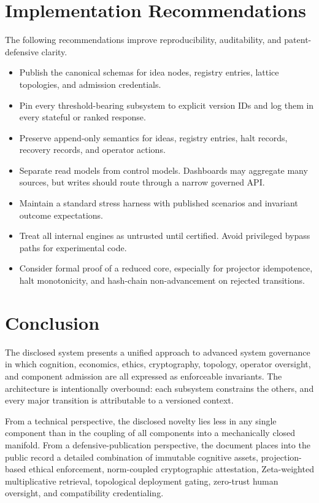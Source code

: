 \documentclass[11pt]{article}
\begin{document}
\section{Implementation Recommendations}
The following recommendations improve reproducibility, auditability, and patent-defensive clarity.
\begin{itemize}[leftmargin=1cm]
  \item Publish the canonical schemas for idea nodes, registry entries, lattice topologies, and admission credentials.
  \item Pin every threshold-bearing subsystem to explicit version IDs and log them in every stateful or ranked response.
  \item Preserve append-only semantics for ideas, registry entries, halt records, recovery records, and operator actions.
  \item Separate read models from control models. Dashboards may aggregate many sources, but writes should route through a narrow governed API.
  \item Maintain a standard stress harness with published scenarios and invariant outcome expectations.
  \item Treat all internal engines as untrusted until certified. Avoid privileged bypass paths for experimental code.
  \item Consider formal proof of a reduced core, especially for projector idempotence, halt monotonicity, and hash-chain non-advancement on rejected transitions.
\end{itemize}

\section{Conclusion}
The disclosed system presents a unified approach to advanced system governance in which cognition, economics, ethics, cryptography, topology, operator oversight, and component admission are all expressed as enforceable invariants. The architecture is intentionally overbound: each subsystem constrains the others, and every major transition is attributable to a versioned context.

From a technical perspective, the disclosed novelty lies less in any single component than in the coupling of all components into a mechanically closed manifold. From a defensive-publication perspective, the document places into the public record a detailed combination of immutable cognitive assets, projection-based ethical enforcement, norm-coupled cryptographic attestation, Zeta-weighted multiplicative retrieval, topological deployment gating, zero-trust human oversight, and compatibility credentialing.
\end{document}
